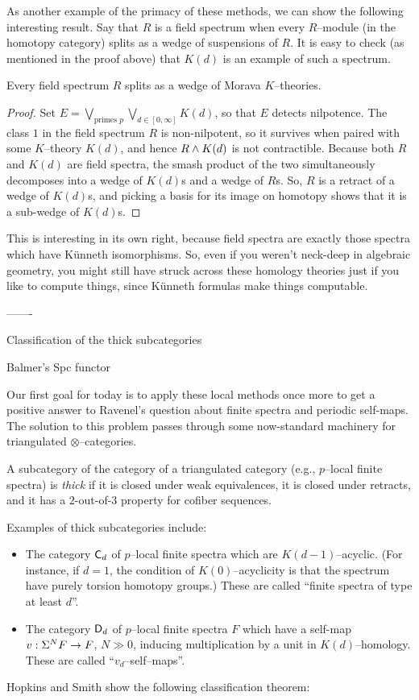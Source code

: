 As another example of the primacy of these methods, we can show the following interesting result.  Say that $R$ is a field spectrum when every $R$--module (in the homotopy category) splits as a wedge of suspensions of $R$.  It is easy to check (as mentioned in the proof above) that $K(d)$ is an example of such a spectrum.

\begin{theorem}
Every field spectrum $R$ splits as a wedge of Morava $K$--theories.
\end{theorem}
\begin{proof}
Set $E = \bigvee_{\text{primes $p$}} \bigvee_{d \in [0, \infty]} K(d)$, so that $E$ detects nilpotence.  The class $1$ in the field spectrum $R$ is non-nilpotent, so it survives when paired with some $K$--theory $K(d)$, and hence $R \wedge K(d)$ is not contractible.  Because both $R$ and $K(d)$ are field spectra, the smash product of the two simultaneously decomposes into a wedge of $K(d)$s and a wedge of $R$s.  So, $R$ is a retract of a wedge of $K(d)$s, and picking a basis for its image on homotopy shows that it is a sub-wedge of $K(d)$s.
\end{proof}

\noindent This is interesting in its own right, because field spectra are exactly those spectra which have K\"unneth isomorphisms.  So, even if you weren't neck-deep in algebraic geometry, you might still have struck across these homology theories just if you like to compute things, since K\"unneth formulas make things computable.

-------

Classification of the thick subcategories

Balmer's Spc functor


Our first goal for today is to apply these local methods once more to get a positive answer to Ravenel's question about finite spectra and periodic self-maps.  The solution to this problem passes through some now-standard machinery for triangulated $\otimes$--categories.

\begin{definition}
A subcategory of the category of a triangulated category (e.g., $p$--local finite spectra) is \textit{thick} if it is closed under weak equivalences, it is closed under retracts, and it has a $2$-out-of-$3$ property for cofiber sequences.
\end{definition}

\noindent Examples of thick subcategories include:
\begin{itemize}
\item The category $\mathsf{C}_d$ of $p$--local finite spectra which are $K(d-1)$--acyclic.  (For instance, if $d = 1$, the condition of $K(0)$--acyclicity is that the spectrum have purely torsion homotopy groups.)  These are called ``finite spectra of type at least $d$''.
\item The category $\mathsf{D}_d$ of $p$--local finite spectra $F$ which have a self-map $v: \Sigma^N F \to F$, $N \gg 0$, inducing multiplication by a unit in $K(d)$--homology.  These are called ``$v_d$--self--maps''.
\end{itemize}
Hopkins and Smith show the following classification theorem:

